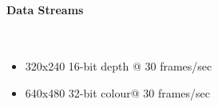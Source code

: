 	\paragraph{ Data Streams} \mbox{} \\
		\begin{itemize}

			\item 320x240 16-bit depth @ 30 frames/sec
			\item 640x480 32-bit colour@ 30 frames/sec
		\end{itemize}
		\vspace*{0.5cm}
